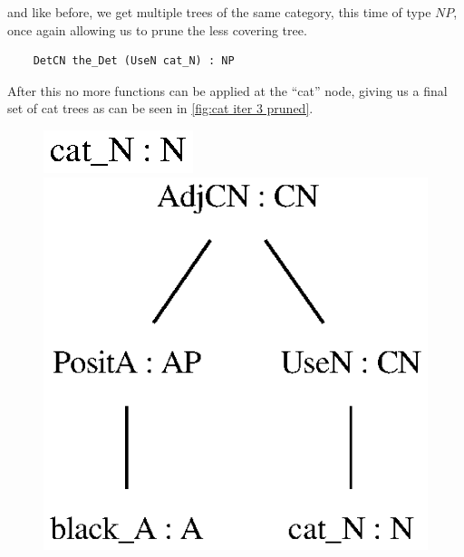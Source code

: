and like before, we get multiple trees of the same category, this time of type $NP$, once again allowing us to prune the less covering tree.
\begin{lstlisting}
    DetCN the_Det (UseN cat_N) : NP
\end{lstlisting}

After this no more functions can be applied at the ``cat'' node, giving us a final set of cat trees as can be seen in \autoref{fig:cat iter 3 pruned}.

\begin{figure}[H]
    \centering
        {\includegraphics[scale=0.7]{thesis/figure/black_cats/cat_N_gf.eps}}
        {\includegraphics[scale=0.7]{thesis/figure/black_cats/black_cat_CN_gf.eps}}

\end{figure}

